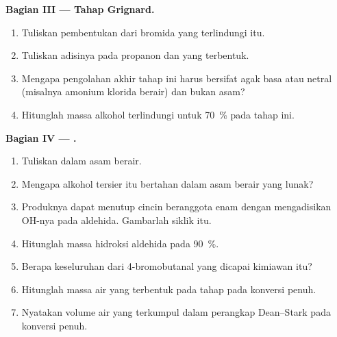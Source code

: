 \begin{problem}
\medskip
\noindent\textbf{Bagian III --- Tahap Grignard.}
\begin{enumerate}[resume]
  \item Tuliskan pembentukan  dari bromida yang
        terlindungi itu.
  \item Tuliskan adisinya pada propanon dan  yang terbentuk.
  \item Mengapa pengolahan akhir tahap ini harus bersifat agak basa atau
        netral (misalnya amonium klorida berair) dan bukan asam?
  \item Hitunglah massa alkohol terlindungi untuk 
        \qty{70}{\percent} pada tahap ini.
\end{enumerate}

\medskip
\noindent\textbf{Bagian IV --- .}
\begin{enumerate}[resume]
  \item Tuliskan  dalam asam berair.
  \item Mengapa alkohol tersier itu bertahan dalam asam berair yang lunak?
  \item Produknya dapat menutup cincin beranggota enam dengan
        mengadisikan OH-nya pada aldehida. Gambarlah  siklik itu.
  \item Hitunglah massa hidroksi aldehida pada  
        \qty{90}{\percent}.
  \item Berapa  keseluruhan dari 4-bromobutanal yang dicapai
        kimiawan itu?
  \item Hitunglah massa air yang terbentuk pada tahap  pada
        konversi penuh.
  \item Nyatakan volume air yang terkumpul dalam perangkap Dean--Stark
        pada konversi penuh.
\end{enumerate}
\end{problem}
